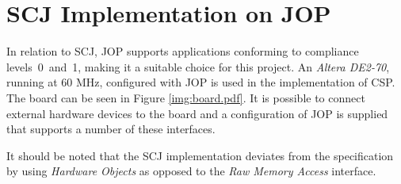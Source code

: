 \section{SCJ Implementation on JOP} %
\label{sec:scj_implementation_on_jop}
In relation to SCJ, JOP supports applications conforming to compliance levels~0~and~1, making it a suitable choice for this project. An \textit{Altera DE2-70}, running at 60 MHz, configured with JOP is used in the implementation of CSP. The board can be seen in Figure \ref{img:board.pdf}. It is possible to connect external hardware devices to the board and a configuration of JOP is supplied that supports a number of these interfaces.

It should be noted that the SCJ implementation deviates from the specification by using \textit{Hardware Objects}\cite{Schoeberl:2011:HAL:2043662.2043666, Schoeberl:2008:HOJ:1371608.1372849} as opposed to the \textit{Raw Memory Access} interface.

